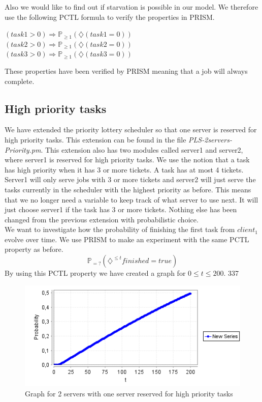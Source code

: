 \documentclass[12pt]{report}
\begin{document}
Also we would like to find out if starvation is possible in our model. We therefore use the following PCTL formula to verify the properties in PRISM.
\begin{center}
$(task1 > 0) \Rightarrow \mathbb{P}_{\geq 1}(\diamondsuit(task1 = 0))$\\
$(task2 > 0) \Rightarrow \mathbb{P}_{\geq 1}(\diamondsuit(task2 = 0))$\\
$(task3 > 0) \Rightarrow \mathbb{P}_{\geq 1}(\diamondsuit(task3 = 0))$
\end{center}
These properties have been verified by PRISM meaning that a job will always complete.

\subsection*{High priority tasks}
We have extended the priority lottery scheduler so that one server is reserved for high priority tasks. This extension can be found in the file \emph{PLS-2servers-Priority.pm}. This extension also has two modules called server1 and server2, where server1 is reserved for high priority tasks. We use the notion that a task has high priority when it has 3 or more tickets. A task has at most 4 tickets. Server1 will only serve jobs with 3 or more tickets and server2 will just serve the tasks currently in the scheduler with the highest priority as before. This means that we no longer need a variable to keep track of what server to use next. It will just choose server1 if the task has 3 or more tickets. Nothing else has been changed from the previous extension with probabilistic choice. 
\\
We want to investigate how the probability of finishing the first task from $client_1$ evolve over time. We use PRISM to make an experiment with the same PCTL property as before.
$$\mathbb{P}_{=?}(\diamondsuit^{\leq t} finished=true)$$
By using this PCTL property we have created a graph for $0 \leq t \leq 200$. 337
\begin{figure}[H]
	\begin{center}
		\includegraphics[scale=0.75]{../GFX/C2.png}
	\end{center}
	\caption{Graph for 2 servers with one server reserved for high priority tasks}
\end{figure}
\end{document}

